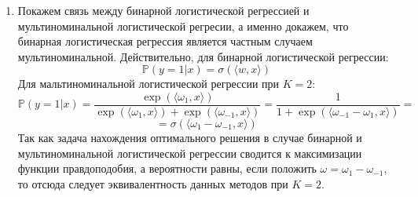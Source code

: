 \begin{enumerate}
	\item Покажем связь между бинарной логистической регрессией и мультиноминальной
	 логистической регресии, а именно докажем, что бинарная логистическая регрессия 
	 является частным случаем мультиноминальной.
	 Действительно, для бинарной логистической регрессии:
	$$
	 	\mathbb{P}(y=1|x) = \sigma(\langle w, x\rangle)
	$$
	Для мальтиноминальной логистической регрессии при $K=2$:
	$$
	 	\mathbb{P}(y=1|x) = \frac{\exp(\langle\omega_1, x\rangle)}
		{\exp(\langle\omega_1, x\rangle) + \exp(\langle\omega_{-1}, x\rangle)}=
		\frac{1}{1 +  \exp(\langle\omega_{-1} - \omega_{1}, x\rangle)}=
	$$ 
	$$
		= \sigma(\langle\omega_{1} - \omega_{-1}, x\rangle)
	$$
	Так как задача нахождения оптимального решения в случае бинарной 
	и мультиноминальной логистической регрессии сводится к максимизации 
	функции правдоподобия, а вероятности равны, если положить $\omega = \omega_1
	- \omega_{-1}$, то отсюда следует эквивалентность данных методов при $K=2$.

	
\end{enumerate}